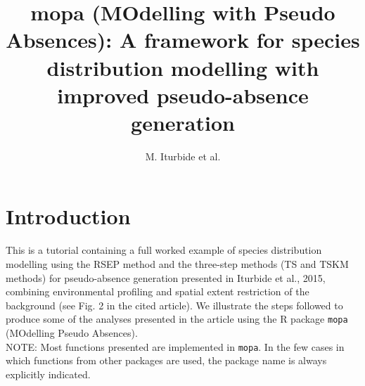 \documentclass[10pt,a4paper]{article}
\begin{document}


% 











\title{mopa (MOdelling with Pseudo Absences): A framework for species distribution modelling with improved pseudo-absence generation}
\author{M. Iturbide et al.}

\tableofcontents

\maketitle


\section{Introduction}
This is a tutorial containing a full worked example of species distribution modelling using the RSEP method and the three-step methods (TS and TSKM methods) for pseudo-absence generation presented in Iturbide et al., 2015, combining environmental profiling and spatial extent restriction of the background (see Fig. 2 in the cited article). We illustrate the steps followed to produce some of the analyses presented in the article using the R package \texttt{mopa} (MOdelling Pseudo Absences). \\



NOTE: Most functions presented are implemented in \texttt{mopa}. In the few cases in which functions from other packages are used, the package name is always explicitly indicated.
\end{document}

